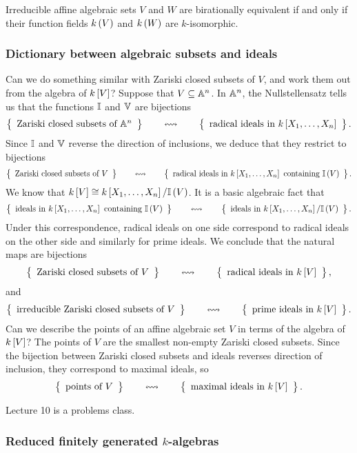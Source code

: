 \begin{corollary}
\label{cor:algebrageometry}
Irreducible affine algebraic sets $ V $ and $ W $ are birationally equivalent if and only if their function fields $ k\br{V} $ and $ k\br{W} $ are $ k $-isomorphic.
\end{corollary}

\pagebreak

\subsubsection{Dictionary between algebraic subsets and ideals}

Can we do something similar with Zariski closed subsets of $ V $, and work them out from the algebra of $ k\sbr{V} $? Suppose that $ V \subseteq \AA^n $. In $ \AA^n $, the Nullstellensatz tells us that the functions $ \II $ and $ \VV $ are bijections
$$ \correspondence{\text{Zariski closed subsets of} \ \AA^n}{\text{radical ideals in} \ k\sbr{X_1, \dots, X_n}}. $$
Since $ \II $ and $ \VV $ reverse the direction of inclusions, we deduce that they restrict to bijections
$$ \correspondence{\text{Zariski closed subsets of} \ V}{\text{radical ideals in} \ k\sbr{X_1, \dots, X_n} \ \text{containing} \ \II\br{V}}. $$
We know that $ k\sbr{V} \cong k\sbr{X_1, \dots, X_n} / \II\br{V} $. It is a basic algebraic fact that
$$ \correspondence{\text{ideals in} \ k\sbr{X_1, \dots, X_n} \ \text{containing} \ \II\br{V}}{\text{ideals in} \ k\sbr{X_1, \dots, X_n} / \II\br{V}}. $$
Under this correspondence, radical ideals on one side correspond to radical ideals on the other side and similarly for prime ideals. We conclude that the natural maps are bijections
$$ \correspondence{\text{Zariski closed subsets of} \ V}{\text{radical ideals in} \ k\sbr{V}}, $$
and
$$ \correspondence{\text{irreducible Zariski closed subsets of} \ V}{\text{prime ideals in} \ k\sbr{V}}. $$
Can we describe the points of an affine algebraic set $ V $ in terms of the algebra of $ k\sbr{V} $? The points of $ V $ are the smallest non-empty Zariski closed subsets. Since the bijection between Zariski closed subsets and ideals reverses direction of inclusion, they correspond to maximal ideals, so
$$ \correspondence{\text{points of} \ V}{\text{maximal ideals in} \ k\sbr{V}}. $$


Lecture 10 is a problems class.

\subsubsection{Reduced finitely generated \texorpdfstring{$ k $}{k}-algebras}

